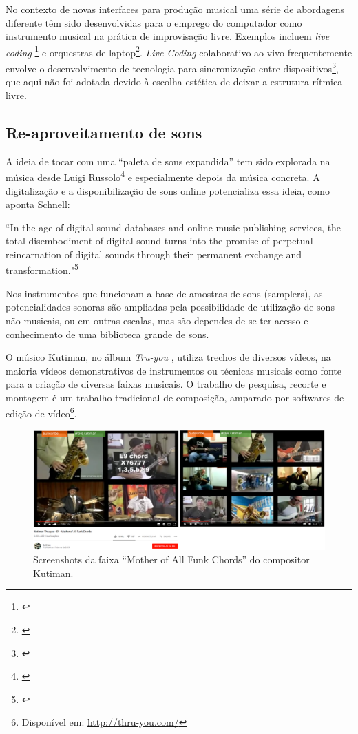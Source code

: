 No contexto de novas interfaces para produção musical uma série de abordagens diferente têm sido desenvolvidas para o emprego do computador como instrumento musical na prática de improvisação livre. Exemplos incluem \emph{live coding} \footnote{\cite{freeman2011collaborative}} e orquestras de laptop\footnote{\cite{Albert2012}}. \emph{Live Coding} colaborativo ao vivo frequentemente envolve o desenvolvimento de tecnologia para sincronização entre dispositivos\footnote{\cite{Wilson2014}}, que aqui não foi adotada devido à escolha estética de deixar a estrutura rítmica livre.


\subsection{Re-aproveitamento de sons}
A ideia de tocar com uma ``paleta de sons expandida'' tem sido explorada na música desde Luigi Russolo\footnote{\cite{Merz2013}} e especialmente depois da música concreta. A digitalização e a disponibilização de sons online potencializa essa ideia, como aponta Schnell:
\begin{citacao}
``In the age of digital sound databases and online music publishing services, the total disembodiment of digital sound turns into the promise of perpetual reincarnation of digital sounds through their permanent exchange and transformation."\footnote{\cite{Schnell2013}}
\end{citacao}

Nos instrumentos que funcionam a base de amostras de sons (samplers), as potencialidades sonoras são ampliadas pela possibilidade de utilização de sons não-musicais, ou em outras escalas, mas são dependes de se ter acesso e conhecimento de uma biblioteca grande de sons. 

O músico Kutiman, no álbum \emph{Tru-you} \citeyear{Kutiman2010}, utiliza trechos de diversos vídeos, na maioria vídeos demonstrativos de instrumentos ou técnicas musicais como fonte para a criação de diversas faixas musicais. O trabalho de pesquisa, recorte e montagem é um trabalho tradicional de composição, amparado por softwares de edição de vídeo\footnote{Disponível em: \url{http://thru-you.com/}}. 


\begin{figure}
\includegraphics[width=1\textwidth]{pictures/cap4/kutiman}
\caption{Screenshots da faixa ``Mother of All Funk Chords'' do compositor Kutiman. }
\label{Kutiman}
\end{figure}


